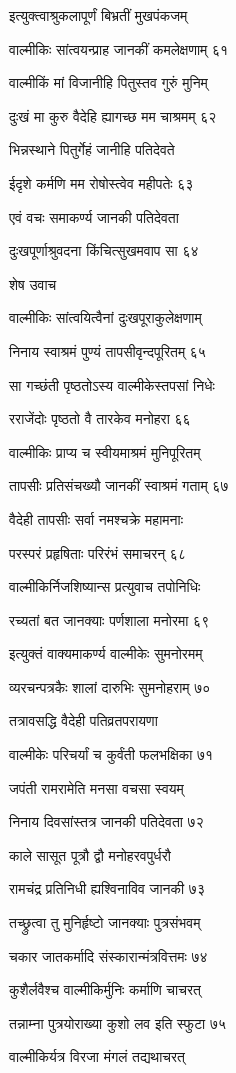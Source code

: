 इत्युक्त्वाश्रुकलापूर्णं बिभ्रतीं मुखपंकजम्

वाल्मीकिः सांत्वयन्प्राह जानकीं कमलेक्षणाम् ६१

वाल्मीकिं मां विजानीहि पितुस्तव गुरुं मुनिम्

दुःखं मा कुरु वैदेहि ह्यागच्छ मम चाश्रमम् ६२

भिन्नस्थाने पितुर्गेहं जानीहि पतिदेवते

ईदृशे कर्मणि मम रोषोस्त्वेव महीपतेः ६३

एवं वचः समाकर्ण्य जानकी पतिदेवता

दुःखपूर्णाश्रुवदना किंचित्सुखमवाप सा ६४

शेष उवाच

वाल्मीकिः सांत्वयित्वैनां दुःखपूराकुलेक्षणाम्

निनाय स्वाश्रमं पुण्यं तापसीवृन्दपूरितम् ६५

सा गच्छंती पृष्ठतोऽस्य वाल्मीकेस्तपसां निधेः

रराजेंदोः पृष्ठतो वै तारकेव मनोहरा ६६

वाल्मीकिः प्राप्य च स्वीयमाश्रमं मुनिपूरितम्

तापसीः प्रतिसंचख्यौ जानकीं स्वाश्रमं गताम् ६७

वैदेही तापसीः सर्वा नमश्चक्रे महामनाः

परस्परं प्रहृषिताः परिरंभं समाचरन् ६८

वाल्मीकिर्निजशिष्यान्स प्रत्युवाच तपोनिधिः

रच्यतां बत जानक्याः पर्णशाला मनोरमा ६९

इत्युक्तं वाक्यमाकर्ण्य वाल्मीकेः सुमनोरमम्

व्यरचन्पत्रकैः शालां दारुभिः सुमनोहराम् ७०

तत्रावसद्धि वैदेही पतिव्रतपरायणा

वाल्मीकेः परिचर्यां च कुर्वंती फलभक्षिका ७१

जपंती रामरामेति मनसा वचसा स्वयम्

निनाय दिवसांस्तत्र जानकी पतिदेवता ७२

काले सासूत पूत्रौ द्वौ मनोहरवपुर्धरौ

रामचंद्र प्रतिनिधी ह्यश्विनाविव जानकी ७३

तच्छ्रुत्वा तु मुनिर्हृष्टो जानक्याः पुत्रसंभवम्

चकार जातकर्मादि संस्कारान्मंत्रवित्तमः ७४

कुशैर्लवैश्च वाल्मीकिर्मुनिः कर्माणि चाचरत्

तन्नाम्ना पुत्रयोराख्या कुशो लव इति स्फुटा ७५

वाल्मीकिर्यत्र विरजा मंगलं तद्यथाचरत्

